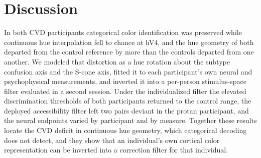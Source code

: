 %
%
%
%
%

\section{Discussion}
\label{sec:discussion}

In both CVD participants categorical color identification was preserved while continuous hue interpolation fell to chance at hV4, and the hue geometry of both departed from the control reference by more than the controls departed from one another. We modeled that distortion as a hue rotation about the subtype confusion axis and the S-cone axis, fitted it to each participant's own neural and psychophysical measurements, and inverted it into a per-person stimulus-space filter evaluated in a second session. Under the individualized filter the elevated discrimination thresholds of both participants returned to the control range, the deployed accessibility filter left two pairs deviant in the protan participant, and the neural endpoints varied by participant and by measure. Together these results locate the CVD deficit in continuous hue geometry, which categorical decoding does not detect, and they show that an individual's own cortical color representation can be inverted into a correction filter for that individual.

